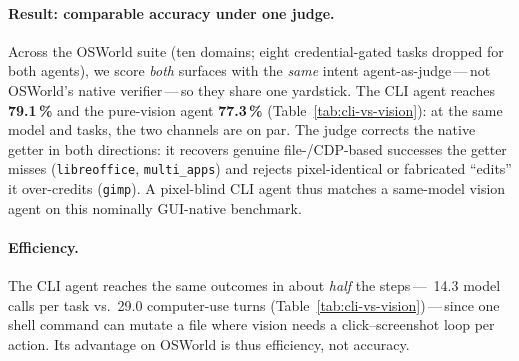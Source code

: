 \documentclass{llmxive}
\providecommand{\cliOswIntent}{79.1}
\providecommand{\cuaVisionIntent}{77.3}
\providecommand{\cliOswSteps}{14.3}
\providecommand{\cuaVisionSteps}{29.0}
\begin{document}
\paragraph{Result: comparable accuracy under one judge.}
\label{app:cli-osworld-results}
Across the OSWorld suite (ten domains; eight credential-gated tasks dropped for
both agents), we score \emph{both} surfaces with the \emph{same} intent
agent-as-judge\,---\,not OSWorld's native verifier\,---\,so they share one
yardstick. The CLI agent reaches \textbf{\cliOswIntent{}\,\%} and the pure-vision
agent \textbf{\cuaVisionIntent{}\,\%} (Table~\ref{tab:cli-vs-vision}): at the
same model and tasks, the two channels are on par. The judge corrects the
native getter in both directions: it recovers
genuine file-/CDP-based successes the getter misses (\texttt{libreoffice},
\texttt{multi\_apps}) and rejects pixel-identical or fabricated ``edits'' it
over-credits (\texttt{gimp}). A pixel-blind CLI agent thus matches a same-model
vision agent on this nominally GUI-native benchmark.

\paragraph{Efficiency.}
The CLI agent reaches the same outcomes in about \emph{half} the steps\,---\,%
\cliOswSteps{} model calls per task vs.\ \cuaVisionSteps{} computer-use turns
(Table~\ref{tab:cli-vs-vision})\,---\,since one shell command can mutate a file
where vision needs a click--screenshot loop per action. Its advantage on
OSWorld is thus efficiency, not accuracy.
\end{document}
